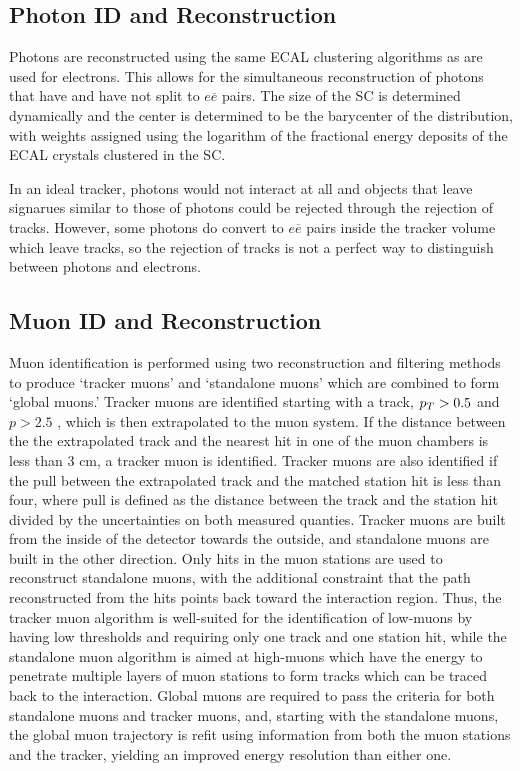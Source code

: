 \subsection{Photon ID and Reconstruction}

 Photons are reconstructed using the same ECAL
  clustering algorithms as are used for electrons.
 This allows for
  the simultaneous reconstruction of
  photons that have and have not split to $e\overline{e}$
  pairs.
 The size of the SC is determined dynamically
  and the center is determined to be the barycenter
  of the distribution, with weights assigned
  using the logarithm of the fractional energy deposits
  of the ECAL crystals clustered in the SC.

 In an ideal tracker, photons would not interact 
  at all and objects that leave signarues
  similar to those of photons could be rejected
  through the rejection of tracks.
 However, some photons do convert to $e\overline{e}$
  pairs inside the tracker volume which leave tracks,
  so the rejection of tracks is not a perfect way 
  to distinguish between photons and electrons.

\subsection{Muon ID and Reconstruction}

 Muon identification is performed using
  two reconstruction and filtering methods to produce 
  `tracker muons' and `standalone muons' which are 
  combined to form  `global muons.'
 Tracker muons are identified starting with
  a track, $p_T>0.5$ \GeV and $p>2.5$ \GeV,
  which is then extrapolated to the muon system.
 If the distance between the the extrapolated
  track and the nearest hit in one of the muon 
  chambers is less than 3 cm, a tracker muon
  is identified.
 Tracker muons are also identified if the 
  pull between the extrapolated track and the
  matched station hit is less than four, where
  pull is defined as the distance between
  the track and the station hit divided by 
  the uncertainties on both measured quanties.
 Tracker muons are built from the inside of the
  detector towards the outside, and 
  standalone muons are built in the other direction.
 Only hits in the muon stations are used to 
  reconstruct standalone muons, with the 
  additional constraint that the path reconstructed
  from the hits points back toward the 
  interaction region.
 Thus, the tracker muon algorithm is well-suited
  for the identification of low-\pt muons by having
  low thresholds and requiring only one track
  and one station hit, while the standalone
  muon algorithm is aimed at high-\pt muons
  which have the energy to penetrate multiple layers
  of muon stations to form tracks which can be
  traced back to the interaction.
 Global muons are required to pass the criteria for both 
  standalone muons and tracker muons, and,
  starting with the standalone muons, 
  the global muon trajectory is refit using information from both 
  the muon stations and the tracker,
  yielding an improved energy resolution than either one.




